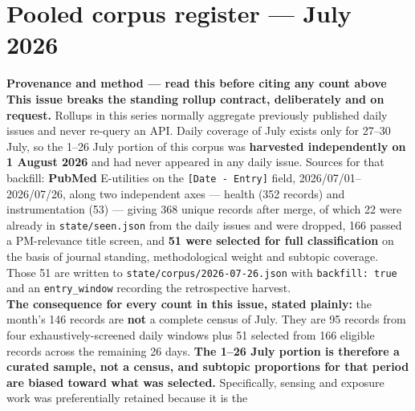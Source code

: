 \documentclass[10pt]{article}
\begin{document}
\vspace{3mm}



\clearpage

\section*{\sffamily\bfseries\color{Deep}Pooled corpus register --- July 2026}
\vspace{-1.5mm}{\color{Coral}\rule{\linewidth}{1.1pt}}\vspace{2.5mm}



\vspace{4mm}
\begin{keybox}
{\sffamily\bfseries\footnotesize\color{Deep}Provenance and method --- read this before
citing any count above}\\[1.2mm]
{\fontsize{7.2}{8.8}\selectfont
\textbf{This issue breaks the standing rollup contract, deliberately and on request.}
Rollups in this series normally aggregate previously published daily issues and never
re-query an API. Daily coverage of July exists only for 27--30 July, so the 1--26 July
portion of this corpus was \textbf{harvested independently on 1 August 2026} and had
never appeared in any daily issue. Sources for that backfill: \textbf{PubMed}
E-utilities on the \texttt{[Date - Entry]} field, 2026/07/01--2026/07/26, along two
independent axes --- health (352 records) and instrumentation (53) --- giving 368 unique
records after merge, of which 22 were already in \texttt{state/seen.json} from the daily
issues and were dropped, 166 passed a PM-relevance title screen, and \textbf{51 were
selected for full classification} on the basis of journal standing, methodological
weight and subtopic coverage. Those 51 are written to
\texttt{state/corpus/2026-07-26.json} with \texttt{backfill: true} and an
\texttt{entry\_window} recording the retrospective harvest.
\\[1.0mm]
\textbf{The consequence for every count in this issue, stated plainly:} the month's 146
records are \textbf{not} a complete census of July. They are 95 records from four
exhaustively-screened daily windows plus 51 selected from 166 eligible records across
the remaining 26 days. \textbf{The 1--26 July portion is therefore a curated sample, not
a census, and subtopic proportions for that period are biased toward what was selected.}
Specifically, sensing and exposure work was preferentially retained because it is the
}
\end{keybox}
\end{document}
